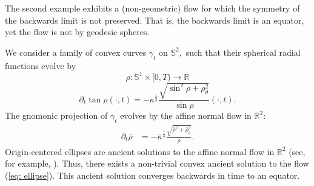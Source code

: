 \documentclass{amsart}
\begin{document}
The second example exhibits a (non-geometric) flow for which the symmetry of the backwards limit is not preserved. That is, the backwards limit is an equator, yet the flow is not by geodesic spheres.
\begin{example}
We consider a family of convex curves $\gamma_t$ on $\mathbb{S}^2,$ such that their spherical radial functions evolve by
\[\rho:\mathbb{S}^1\times[0,T)\to \mathbb{R}\]
\begin{equation}\label{eq: ellipse}
\partial_t\tan\rho(\cdot,t)=-\kappa^{\frac{1}{3}} \frac{\sqrt{\sin^2\rho+\rho_{\theta}^2}}{\sin\rho}(\cdot,t).
\end{equation}
The gnomonic projection of $\gamma_t$ evolves by the affine normal flow in $\mathbb{R}^2:$
\begin{align*}
\partial_t\bar{\rho}&=-\bar{\kappa}^{\frac{1}{3}}\frac{\sqrt{\bar{\rho}^2+\bar{\rho}_{\theta}^2}}{\bar{\rho}}.
\end{align*}
Origin-centered ellipses are ancient solutions to the affine normal flow in $\mathbb{R}^2$ (see, for example, \cite{Ivaki:2016}). Thus, there exists a non-trivial convex ancient solution to the flow (\ref{eq: ellipse}). This ancient solution converges backwards in time to an equator.
\end{example}
\end{document}
